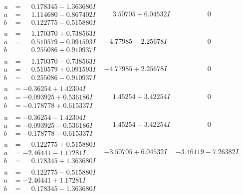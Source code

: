 \documentclass[1p]{elsarticle_modified}
\theoremstyle{definition}
\begin{document}
$$\begin{array}{c|c|c}
\begin{aligned}
u &= \phantom{-}0.178345 - 1.363680 I \\
a &= \phantom{-}1.114680 - 0.867402 I \\
b &= \phantom{-}0.122775 - 0.515880 I\end{aligned}
 & \phantom{-}3.50705 + 6.04532 I & \phantom{-0.000000 } 0 \\ \hline\begin{aligned}
u &= \phantom{-}1.170370 + 0.738563 I \\
a &= \phantom{-}0.510579 - 0.091593 I \\
b &= \phantom{-}0.255086 + 0.910937 I\end{aligned}
 & -4.77985 - 2.25678 I & \phantom{-0.000000 } 0 \\ \hline\begin{aligned}
u &= \phantom{-}1.170370 - 0.738563 I \\
a &= \phantom{-}0.510579 + 0.091593 I \\
b &= \phantom{-}0.255086 - 0.910937 I\end{aligned}
 & -4.77985 + 2.25678 I & \phantom{-0.000000 } 0 \\ \hline\begin{aligned}
u &= -0.36254 + 1.42304 I \\
a &= -0.093925 + 0.536186 I \\
b &= -0.178778 + 0.615337 I\end{aligned}
 & \phantom{-}1.45254 + 3.42254 I & \phantom{-0.000000 } 0 \\ \hline\begin{aligned}
u &= -0.36254 - 1.42304 I \\
a &= -0.093925 - 0.536186 I \\
b &= -0.178778 - 0.615337 I\end{aligned}
 & \phantom{-}1.45254 - 3.42254 I & \phantom{-0.000000 } 0 \\ \hline\begin{aligned}
u &= \phantom{-}0.122775 + 0.515880 I \\
a &= -2.46441 - 1.17281 I \\
b &= \phantom{-}0.178345 + 1.363680 I\end{aligned}
 & -3.50705 + 6.04532 I & -3.46119 - 7.26382 I \\ \hline\begin{aligned}
u &= \phantom{-}0.122775 - 0.515880 I \\
a &= -2.46441 + 1.17281 I \\
b &= \phantom{-}0.178345 - 1.363680 I\end{aligned}

\end{array}$$
\end{document}
